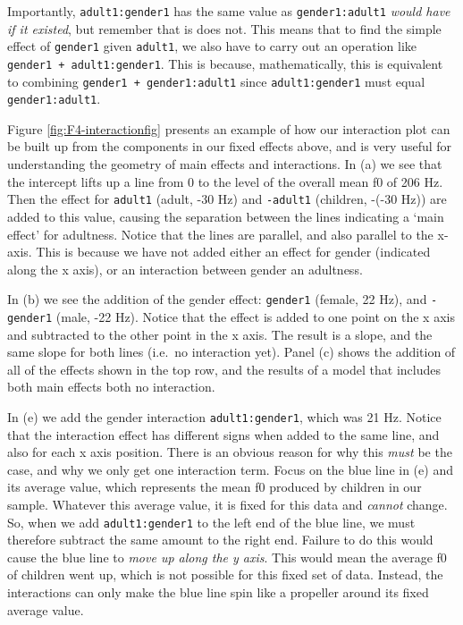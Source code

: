 \documentclass[
]{book}
\begin{document}
Importantly, \texttt{adult1:gender1} has the same value as \texttt{gender1:adult1} \emph{would have if it existed}, but remember that is does not. This means that to find the simple effect of \texttt{gender1} given \texttt{adult1}, we also have to carry out an operation like \texttt{gender1\ +\ adult1:gender1}. This is because, mathematically, this is equivalent to combining \texttt{gender1\ +\ gender1:adult1} since \texttt{adult1:gender1} must equal \texttt{gender1:adult1}.

Figure \ref{fig:F4-interactionfig} presents an example of how our interaction plot can be built up from the components in our fixed effects above, and is very useful for understanding the geometry of main effects and interactions. In (a) we see that the intercept lifts up a line from 0 to the level of the overall mean f0 of 206 Hz. Then the effect for \texttt{adult1} (adult, -30 Hz) and \texttt{-adult1} (children, -(-30 Hz)) are added to this value, causing the separation between the lines indicating a `main effect' for adultness. Notice that the lines are parallel, and also parallel to the x-axis. This is because we have not added either an effect for gender (indicated along the x axis), or an interaction between gender an adultness.

In (b) we see the addition of the gender effect: \texttt{gender1} (female, 22 Hz), and \texttt{-gender1} (male, -22 Hz). Notice that the effect is added to one point on the x axis and subtracted to the other point in the x axis. The result is a slope, and the same slope for both lines (i.e.~no interaction yet). Panel (c) shows the addition of all of the effects shown in the top row, and the results of a model that includes both main effects both no interaction.

In (e) we add the gender interaction \texttt{adult1:gender1}, which was 21 Hz. Notice that the interaction effect has different signs when added to the same line, and also for each x axis position. There is an obvious reason for why this \emph{must} be the case, and why we only get one interaction term. Focus on the blue line in (e) and its average value, which represents the mean f0 produced by children in our sample. Whatever this average value, it is fixed for this data and \emph{cannot} change. So, when we add \texttt{adult1:gender1} to the left end of the blue line, we must therefore subtract the same amount to the right end. Failure to do this would cause the blue line to \emph{move up along the y axis}. This would mean the average f0 of children went up, which is not possible for this fixed set of data. Instead, the interactions can only make the blue line spin like a propeller around its fixed average value.
\end{document}
